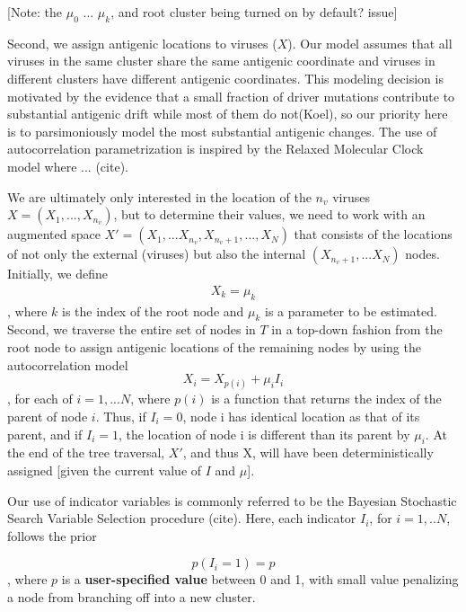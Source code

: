 \documentclass[11pt,oneside,letterpaper]{article}
\begin{document}
[Note: the $\mu_0$ ... $\mu_k$, and root cluster being turned on by default? issue]

Second, we assign antigenic locations to viruses ($X$). 
Our model assumes that all viruses in the same cluster share the same antigenic coordinate and viruses in different clusters have different antigenic coordinates.
This modeling decision is motivated by the evidence that a small fraction of driver mutations contribute to substantial antigenic drift while most of them do not(Koel), so our priority here is to parsimoniously model the most substantial antigenic changes.
The use of autocorrelation parametrization is inspired by the Relaxed Molecular Clock model where ... (cite).


We are ultimately only interested in the location of the $n_v$ viruses $X=(X_1,..., X_{n_{v}})$, but to determine their values, we need to work with an augmented space $X' = (X_1, ...X_{n_v}, X_{ n_v +1},..., X_N)$ that consists of the locations of not only the external (viruses) but also the internal $(X_{ n_{v}+1}, ... X_N)$ nodes.
Initially, we define
\begin{eqnarray}
 	X_{k} = \mu_k  
\end{eqnarray}
, where $k$ is the index of the root node and $\mu_k$ is a parameter to be estimated. 
Second, we traverse the entire set of nodes in $T$ in a top-down fashion from the root node to assign antigenic locations of the remaining nodes by using the autocorrelation model
\begin{equation}
	X_i=  X_{p(i)} + \mu_i    I_i   
\end{equation}
, for each of $i=1,... N$, where $p(i)$ is a function that returns the index of the parent of node $i$.
Thus, if $I_i=0$, node i has identical location as that of its parent, and if $I_i=1$, the location of node i is different than its parent by $\mu_i$.
At the end of the tree traversal, $X'$, and thus X, will have been deterministically assigned [given the current value of $I$ and $\mu$].




Our use of indicator variables is commonly referred to be the Bayesian Stochastic Search Variable Selection procedure (cite). Here, each indicator $I_i$, for $i=1,..N$, follows the prior

\begin{equation}
 p(I_i = 1) = p
\end{equation}
, where $p$ is a \textbf{user-specified value} between 0 and 1, with small value penalizing a node from branching off into a new cluster.
\end{document}

